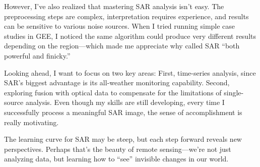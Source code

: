 \documentclass[
  letterpaper,
  DIV=11,
  numbers=noendperiod]{scrreprt}
\begin{document}
However, I've also realized that mastering SAR analysis isn't easy. The
preprocessing steps are complex, interpretation requires experience, and
results can be sensitive to various noise sources. When I tried running
simple case studies in GEE, I noticed the same algorithm could produce
very different results depending on the region---which made me
appreciate why called SAR ``both powerful and finicky.''

Looking ahead, I want to focus on two key areas: First, time-series
analysis, since SAR's biggest advantage is its all-weather monitoring
capability. Second, exploring fusion with optical data to compensate for
the limitations of single-source analysis. Even though my skills are
still developing, every time I successfully process a meaningful SAR
image, the sense of accomplishment is really motivating.

The learning curve for SAR may be steep, but each step forward reveals
new perspectives. Perhaps that's the beauty of remote sensing---we're
not just analyzing data, but learning how to ``see'' invisible changes
in our world.
\end{document}
